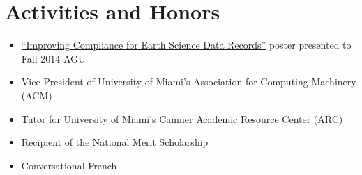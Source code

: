 \documentclass[letterpaper,12pt]{article}
\begin{document}
\vskip 3mm

\section*{Activities and Honors}
\begin{itemize}
  \item \href{https://oychang.com/research/jpl/compliance-checker-poster.pdf}{``Improving Compliance for Earth Science Data Records''} poster presented to Fall 2014 AGU
  \item Vice President of University of Miami's Association for Computing Machinery (ACM)
  \item Tutor for University of Miami's Camner Academic Resource Center (ARC)
  \item Recipient of the National Merit Scholarship
  \item Conversational French
\end{itemize}
\end{document}
